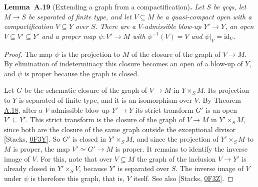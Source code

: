 \documentclass[11pt]{article}
\newenvironment{bpstatement}[2]{\par\addvspace{0.6\baselineskip}\noindent\textbf{#1}#2\textbf{.}\enspace\ignorespaces}
  {\par\addvspace{0.4\baselineskip}}
\newenvironment{bpstatementit}[2]{\begin{bpstatement}{#1}{#2}\itshape\ignorespaces}{\end{bpstatement}}
\begin{document}
\label{bp49}%
\begin{bpstatementit}{Lemma~A.19}{ (Extending a graph from a compactification)}
Let \(S\) be qcqs, let \(M\to S\) be separated of finite type, and let \(V\subseteq M\) be a quasi-compact open with a compactification \(V\subseteq Y\) over \(S\). There are a \(V\)-admissible blow-up \(Y'\to Y\), an open \(V\subseteq V'\subseteq Y'\) and a proper map \(\psi:V'\to M\) with \(\psi^{-1}(V)=V\) and \(\psi|_V=\mathrm{id}_V\).
\end{bpstatementit}

\begin{proof}[{Proof}]\label{bp50}%
The map \(\psi\) is the projection to \(M\) of the closure of the graph of \(V\to M\). By elimination of indeterminacy this closure becomes an open of a blow-up of \(Y\), and \(\psi\) is proper because the graph is closed.

Let \(G\) be the schematic closure of the graph of \(V\to M\) in \(Y\times_SM\). Its projection to \(Y\) is separated of finite type, and it is an isomorphism over \(V\). By Theorem \hyperref[bp46]{A.18}, after a \(V\)-admissible blow-up \(Y'\to Y\) its strict transform \(G'\) is an open \(V'\subseteq Y'\). This strict transform is the closure of the graph of \(V\to M\) in \(Y'\times_SM\), since both are the closure of the same graph outside the exceptional divisor [Stacks, \href{https://stacks.math.columbia.edu/tag/0F3Y}{0F3Y}]. So \(G'\) is closed in \(Y'\times_SM\), and since the projection of \(Y'\times_SM\) to \(M\) is proper, the map \(V'\simeq G'\to M\) is proper. It remains to identify the inverse image of \(V\). For this, note that over \(V\subseteq M\) the graph of the inclusion \(V\to Y'\) is already closed in \(Y'\times_SV\), because \(Y'\) is separated over \(S\). The inverse image of \(V\) under \(\psi\) is therefore this graph, that is, \(V\) itself. See also [Stacks, \href{https://stacks.math.columbia.edu/tag/0F3Z}{0F3Z}].
\end{proof}


\end{document}
